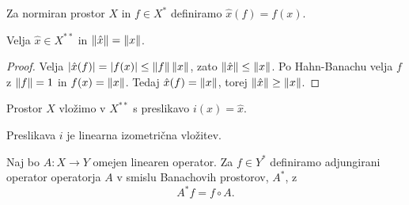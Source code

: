 
\begin{definicija}
  Za normiran prostor $X$ in $f \in X^*$ definiramo $\hat{x}(f) = f(x)$.
\end{definicija}

\begin{trditev}
  Velja $\hat{x} \in X^{**}$ in $\left\lVert\hat{x}\right\rVert = \left\lVert x\right\rVert$.
\end{trditev}

\begin{proof}
  Velja $\left| \hat{x}(f) \right| = \left| f(x) \right| \le \left\lVert f\right\rVert \left\lVert x\right\rVert$, zato
  $\left\lVert\hat{x}\right\rVert \le \left\lVert x\right\rVert$.
  Po Hahn-Banachu velja $f$ z $\left\lVert f\right\rVert = 1$ in $f(x) = \left\lVert x\right\rVert$.
  Tedaj $\hat{x}(f) = \left\lVert x\right\rVert$, torej $\left\lVert\hat{x}\right\rVert \ge \left\lVert x\right\rVert$.
\end{proof}

Prostor $X$ vložimo v $X^{**}$ s preslikavo $i(x) = \hat{x}$.

\begin{trditev}
  Preslikava $i$ je linearna izometrična vložitev.
\end{trditev}

Naj bo $A: X \to Y$ omejen linearen operator.
Za $f \in Y^*$ definiramo adjungirani operator operatorja $A$ v smislu
Banachovih prostorov, $A^*$, z
\[
  A^* f = f \circ A.
\]


